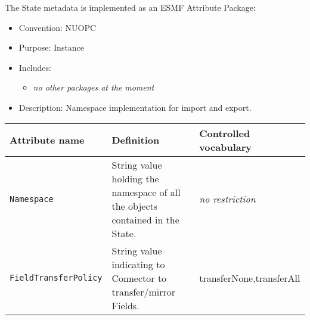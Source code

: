 \label{StateMeta}
The State metadata is implemented as an ESMF Attribute Package:

\begin{itemize}
    \item Convention: NUOPC
    \item Purpose: Instance
    \item Includes:
    \begin{itemize}
        \item {\em no other packages at the moment}
    \end{itemize} 
    \item Description: Namespace implementation for import and export. 
\end{itemize}

\begin{tabular}{|p{5cm}|p{5cm}|p{35mm}|}
     \hline\hline
     {\bf Attribute name} & {\bf Definition} & {\bf Controlled vocabulary}\\
     \hline\hline
     {\tt Namespace}            & String value holding the namespace of all the objects contained in the State.& {\em no restriction}\\ \hline
     {\tt FieldTransferPolicy}  & String value indicating to Connector to transfer/mirror Fields. & transferNone,\newline transferAll\\ \hline
     \hline
\end{tabular}
